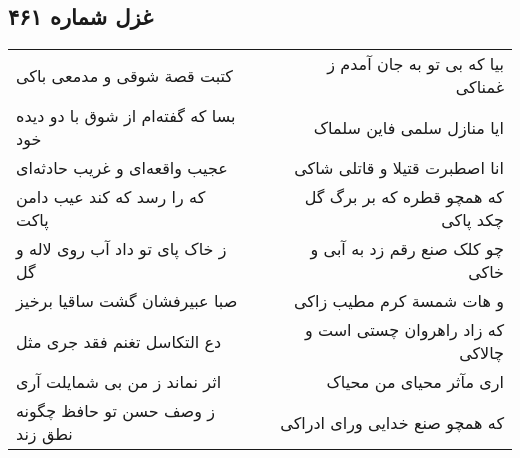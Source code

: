 \begin{center}
\section*{غزل شماره ۴۶۱}
\label{sec:sh461}
\begin{longtable}{l p{0.5cm} r}
کتبت قصة شوقی و مدمعی باکی
&&
بیا که بی تو به جان آمدم ز غمناکی
\\
بسا که گفته‌ام از شوق با دو دیده خود
&&
ایا منازل سلمی فاین سلماک
\\
عجیب واقعه‌ای و غریب حادثه‌ای
&&
انا اصطبرت قتیلا و قاتلی شاکی
\\
که را رسد که کند عیب دامن پاکت
&&
که همچو قطره که بر برگ گل چکد پاکی
\\
ز خاک پای تو داد آب روی لاله و گل
&&
چو کلک صنع رقم زد به آبی و خاکی
\\
صبا عبیرفشان گشت ساقیا برخیز
&&
و هات شمسة کرم مطیب زاکی
\\
دع التکاسل تغنم فقد جری مثل
&&
که زاد راهروان چستی است و چالاکی
\\
اثر نماند ز من بی شمایلت آری
&&
اری مآثر محیای من محیاک
\\
ز وصف حسن تو حافظ چگونه نطق زند
&&
که همچو صنع خدایی ورای ادراکی
\\
\end{longtable}
\end{center}
